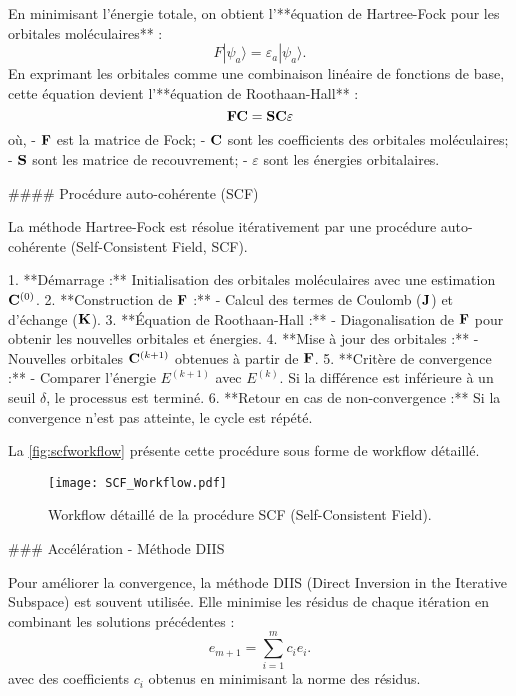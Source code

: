 \documentclass[12pt,a4paper]{report}
\numberwithin{equation}{section}
\numberwithin{figure}{section}
\numberwithin{table}{section}
\begin{document}
\begin{markdown}
En minimisant l'énergie totale, on obtient l'**équation de Hartree-Fock pour les orbitales moléculaires** :
\begin{equation}
F|\psi_a\rangle = \varepsilon_a|\psi_a\rangle .
\end{equation}
En exprimant les orbitales comme une combinaison linéaire de fonctions de base, cette équation devient l'**équation de Roothaan-Hall** :
\begin{equation}
\vb{F}\vb{C} = \vb{S}\vb{C}\varepsilon
\end{equation}
où,
- $\vb{F}$ est la matrice de Fock;
- $\vb{C}$ sont les coefficients des orbitales moléculaires;
- $\vb{S}$ sont les matrice de recouvrement;
- $\varepsilon$ sont les énergies orbitalaires.

#### Procédure auto-cohérente (SCF)

La méthode Hartree-Fock est résolue itérativement par une procédure auto-cohérente (Self-Consistent Field, SCF).

1. **Démarrage :** Initialisation des orbitales moléculaires avec une estimation $\vb{C}^{(0)}$.
2. **Construction de $\vb{F}$ :**
   - Calcul des termes de Coulomb ($\vb{J}$) et d'échange ($\vb{K}$).
3. **Équation de Roothaan-Hall :**
   - Diagonalisation de $\vb{F}$ pour obtenir les nouvelles orbitales et énergies.
4. **Mise à jour des orbitales :**
   - Nouvelles orbitales $\vb{C}^{(k+1)}$ obtenues à partir de $\vb{F}$.
5. **Critère de convergence :**
   - Comparer l'énergie $E^{(k+1)}$ avec $E^{(k)}$. Si la différence est inférieure à un seuil $\delta$, le processus est terminé.
6. **Retour en cas de non-convergence :** Si la convergence n’est pas atteinte, le cycle est répété.

La \autoref{fig:scfworkflow} présente cette procédure sous forme de workflow détaillé.

\begin{figure}[tbh]
\centering
\texttt{[image: SCF\_Workflow.pdf]}
\caption{Workflow détaillé de la procédure SCF (Self-Consistent Field).}
\label{fig:scfworkflow}
\end{figure}

### Accélération - Méthode DIIS

Pour améliorer la convergence, la méthode DIIS (Direct Inversion in the Iterative Subspace) est souvent utilisée. Elle minimise les résidus de chaque itération en combinant les solutions précédentes :
\begin{equation}
e_{m+1} = \sum_{i=1}^m c_i e_i.
\end{equation}
avec des coefficients $c_i$ obtenus en minimisant la norme des résidus.


\end{markdown}
\end{document}
